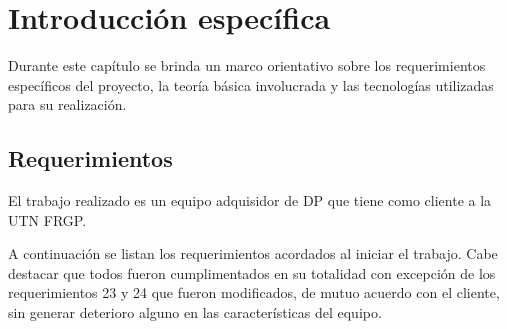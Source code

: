 \chapter{Introducción específica} %

\label{Chapter2}

Durante este capítulo se brinda un marco orientativo sobre los requerimientos específicos del proyecto, la teoría básica involucrada y las tecnologías utilizadas para su realización.

\section{Requerimientos}
El trabajo realizado es un equipo adquisidor de DP que tiene como cliente a la UTN FRGP. 

A continuación se listan los requerimientos acordados al iniciar el trabajo. Cabe destacar que todos fueron cumplimentados en su totalidad con excepción de los requerimientos 23 y 24 que fueron modificados, de mutuo acuerdo con el cliente, sin generar deterioro alguno en las características del equipo.

